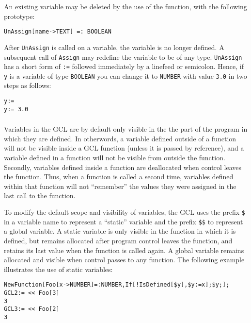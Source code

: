 An existing variable may be deleted by the use of the 
function, with the following prototype:

\begin{verbatim}
UnAssign[name->TEXT] =: BOOLEAN
\end{verbatim}

\noindent After \verb+UnAssign+ is called on a variable, the variable
is no longer defined.  A subsequent call of {\tt Assign} may redefine
the variable to be of any type.  \verb+UnAssign+ has a short form of
\verb+:=+ followed immediately by a linefeed or semicolon.  Hence, if
\verb+y+ is a variable of type \verb+BOOLEAN+ you can change it to
\verb+NUMBER+ with value \verb+3.0+ in two steps as follows:

\begin{verbatim}
y:=
y:= 3.0
\end{verbatim}  

\subsubsection{}

Variables in the GCL are by default only visible in the the part of
the program in which they are defined.  In otherwords, a variable
defined outside of a function will not be visible inside a GCL
function (unless it is passed by reference), and a variable defined in
a function will not be visible from outside the function.  Secondly,
variables defined inside a function are deallocated when control
leaves the function.  Thus, when a function is called a second time,
variables defined within that function will not ``remember'' the
values they were assigned in the last call to the function.  

To modify the default scope and visibility of variables, the GCL uses
the prefix \verb+$+ in a variable name to represent a ``static''
variable and the prefix \verb+$$+ to represent
a global variable.  A static variable
is only visible in the function in which it is defined, but remains
allocated after program control leaves the function, and retains its
last value when the function is called again.  A global variable
remains allocated and visible when control passes to any function.  The
following example illustrates the use of static variables:

\begin{verbatim}
NewFunction[Foo[x->NUMBER]=:NUMBER,If[!IsDefined[$y],$y:=x];$y;];
GCL2:= << Foo[3]
3
GCL3:= << Foo[2]
3
\end{verbatim}

